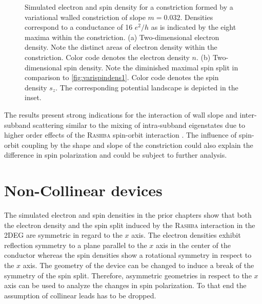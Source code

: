 \begin{figure}[h]
  \hspace{14pt}
  \hspace{4pt}
  \caption{Simulated electron and spin density for a constriction formed by a variational walled constriction of slope $m=0.032$. Densities correspond to a conductance of 16 $e^2/h$ as is indicated by the eight maxima within the constriction. (a) Two-dimensional electron density. Note the distinct areas of electron density within the constriction. Color code denotes the electron density $n$. (b) Two-dimensional spin density. Note the diminished maximal spin split in comparison to \cref{fig:varispindens1}. Color code denotes the spin density $s_z$. The corresponding potential landscape is depicted in the inset.}
\end{figure}
The results present strong indications for the interaction of wall slope and inter-subband scattering similar to the mixing of intra-subband eigenstates due to higher order effects of the \textsc{Rashba} spin-orbit interaction \cite{Wolfgang2003PhysicaE.18.337}. The influence of spin-orbit coupling by the shape and slope of the constriction could also explain the difference in spin polarization and could be subject to further analysis.
\FloatBarrier
\section{Non-Collinear devices}
The simulated electron and spin densities in the prior chapters show that both the electron density and the spin split induced by the \textsc{Rashba} interaction in the 2DEG are symmetric in regard to the $x$ axis. The electron densities exhibit reflection symmetry to a plane parallel to the $x$ axis in the center of the conductor whereas the spin densities show a rotational symmetry in respect to the $x$ axis. The geometry of the device can be changed to induce a break of the symmetry of the spin split. Therefore, asymmetric geometries in respect to the $x$ axis can be used to analyze the changes in spin polarization. To that end the assumption of collinear leads has to be dropped.

